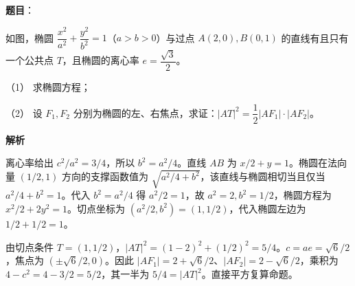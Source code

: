 \begin{answer}

\textbf{题目}：

如图，椭圆 $\dfrac{x^2}{a^2}+\dfrac{y^2}{b^2}=1$（$a>b>0$）与过点 $A(2,0),B(0,1)$ 的直线有且只有一个公共点 $T$，且椭圆的离心率 $e=\dfrac{\sqrt3}{2}$。

（1） 求椭圆方程；

（2） 设 $F_1,F_2$ 分别为椭圆的左、右焦点，求证：$|AT|^2=\dfrac12|AF_1|\cdot|AF_2|$。
\nopagebreak[4]
\begin{center}\end{center}
\nopagebreak[4]
\textbf{解析}


离心率给出 $c^2/a^2=3/4$，所以 $b^2=a^2/4$。直线 $AB$ 为 $x/2+y=1$。椭圆在法向量 $(1/2,1)$ 方向的支撑函数值为 $\sqrt{a^2/4+b^2}$，该直线与椭圆相切当且仅当 $a^2/4+b^2=1$。代入 $b^2=a^2/4$ 得 $a^2/2=1$，故 $a^2=2,b^2=1/2$，椭圆方程为 $x^2/2+2y^2=1$。切点坐标为 $(a^2/2,b^2)=(1,1/2)$，代入椭圆左边为 $1/2+1/2=1$。


由切点条件 $T=(1,1/2)$，$|AT|^2=(1-2)^2+(1/2)^2=5/4$。$c=ae=\sqrt6/2$，焦点为 $(\pm\sqrt6/2,0)$。因此 $|AF_1|=2+\sqrt6/2$、$|AF_2|=2-\sqrt6/2$，乘积为 $4-c^2=4-3/2=5/2$，其一半为 $5/4=|AT|^2$。直接平方复算命题。



\end{answer}
